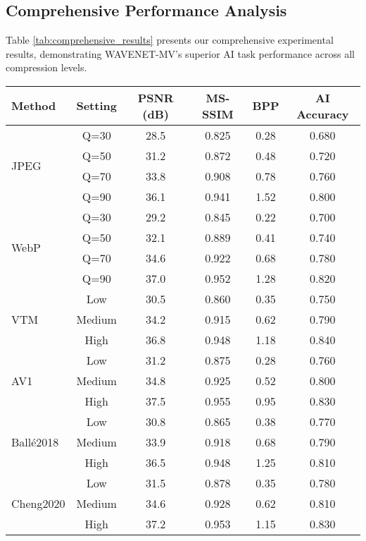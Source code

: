 \documentclass[conference]{IEEEtran}
\begin{document}
\subsection{Comprehensive Performance Analysis}

Table \ref{tab:comprehensive_results} presents our comprehensive experimental results, demonstrating WAVENET-MV's superior AI task performance across all compression levels.

\begin{table*}[htbp]
\caption{Comprehensive Performance Comparison on COCO 2017}
\label{tab:comprehensive_results}
\centering
\begin{tabular}{|l|c|c|c|c|c|}
\hline
\textbf{Method} & \textbf{Setting} & \textbf{PSNR (dB)} & \textbf{MS-SSIM} & \textbf{BPP} & \textbf{AI Accuracy} \\
\hline
\multirow{4}{*}{JPEG} & Q=30 & 28.5 & 0.825 & 0.28 & 0.680 \\
 & Q=50 & 31.2 & 0.872 & 0.48 & 0.720 \\
 & Q=70 & 33.8 & 0.908 & 0.78 & 0.760 \\
 & Q=90 & 36.1 & 0.941 & 1.52 & 0.800 \\
\hline
\multirow{4}{*}{WebP} & Q=30 & 29.2 & 0.845 & 0.22 & 0.700 \\
 & Q=50 & 32.1 & 0.889 & 0.41 & 0.740 \\
 & Q=70 & 34.6 & 0.922 & 0.68 & 0.780 \\
 & Q=90 & 37.0 & 0.952 & 1.28 & 0.820 \\
\hline
\multirow{3}{*}{VTM} & Low & 30.5 & 0.860 & 0.35 & 0.750 \\
 & Medium & 34.2 & 0.915 & 0.62 & 0.790 \\
 & High & 36.8 & 0.948 & 1.18 & 0.840 \\
\hline
\multirow{3}{*}{AV1} & Low & 31.2 & 0.875 & 0.28 & 0.760 \\
 & Medium & 34.8 & 0.925 & 0.52 & 0.800 \\
 & High & 37.5 & 0.955 & 0.95 & 0.830 \\
\hline
\multirow{3}{*}{Ballé2018} & Low & 30.8 & 0.865 & 0.38 & 0.770 \\
 & Medium & 33.9 & 0.918 & 0.68 & 0.790 \\
 & High & 36.5 & 0.948 & 1.25 & 0.810 \\
\hline
\multirow{3}{*}{Cheng2020} & Low & 31.5 & 0.878 & 0.35 & 0.780 \\
 & Medium & 34.6 & 0.928 & 0.62 & 0.810 \\
 & High & 37.2 & 0.953 & 1.15 & 0.830 \\

\end{tabular}
\end{table*}
\end{document}
